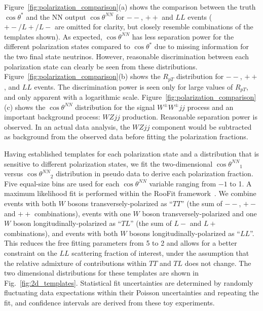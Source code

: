 \documentclass[aps,prl,twocolumn,showpacs,superscriptaddress,groupeaddress,floatfix]{revtex4}
\def\ssWW{\ensuremath{ W^{\pm}W^{\pm}jj }\xspace}
\def\ts{\ensuremath{ \theta^{*} }\xspace}
\def\tsNN{\ensuremath{ \theta^{NN} }\xspace}
\def\cts{\ensuremath{ \cos\ts }\xspace}
\def\ctsNN{\ensuremath{ \cos\tsNN }\xspace}
\begin{document}
Figure~\ref{fig:polarization_comparison}(a) shows the comparison between the truth \cts and 
the NN output \ctsNN for $--$, $++$ and $LL$ events ( $+-/L+/L-$ are omitted for clarity, but closely resemble combinations of the templates shown). As expected, \ctsNN has less separation 
power for the different polarization states compared to \cts due to missing information for the two final state neutrinos. 
However, reasonable discrimination between each polarization state can clearly be seen from these distributions. 
Figure~\ref{fig:polarization_comparison}(b) shows the $R_{pT}$ distribution for $--$, $++$, and $LL$ events. 
The discrimination power is seen only for large values of $R_{pT}$, and only apparent with a logarithmic scale. Figure~\ref{fig:polarization_comparison}(c) shows the \ctsNN distribution for the signal \ssWW process and an important background process: $WZjj$ production.  Reasonable separation power is observed. In an actual data analysis, the $WZjj$ component would be subtracted as background
from the observed data before fitting the polarization fractions.

Having established templates for each polarization state and a
distribution that is sensitive to different polarization states, 
we fit the two-dimensional $\ctsNN_1$ versus $\ctsNN_2$
distribution in pseudo data to derive each polarization fraction. Five equal-size bins 
are used for each \ctsNN variable ranging from $-1$ to 1. A maximum likelihood fit is performed 
within the RooFit framework~\cite{RooFit}. We combine events with both $W$ bosons transversely-polarized as
``$TT$'' (the sum of $--$, $+-$ and $++$ combinations), events with
one $W$ boson transversely-polarized and one $W$ boson
longitudinally-polarized as ``$TL$'' (the sum of $L-$ and $L+$
combinations), and events with both $W$ bosons
longitudinally-polarized as ``$LL$''. This reduces the free fitting parameters from 5 to 2 and 
allows for a better constraint on the $LL$ scattering fraction of interest, under the assumption that
the relative admixture of contributions within $TT$ and $TL$ does not change. The two dimensional distributions for these templates are shown in Fig.~\ref{fig:2d_templates}. Statistical fit uncertainties are determined by randomly
fluctuating data expectations within their Poisson uncertainties and
repeating the fit, and confidence intervals are derived from these toy experiments.  
\end{document}
